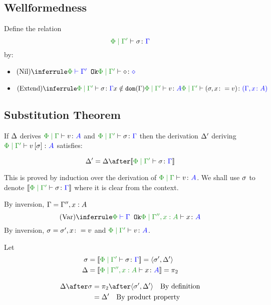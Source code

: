 \documentclass{report}
\begin{document}
    \subsection{Wellformedness}
Define the relation $$\etyperelation{\P}{\G'}{\si}{\G}$$ by:

\begin{itemize}
    \item $\ntreeruleI{Nil}{\wellformedok{\P}{\G'}}{\etyperelation{\P}{\G'}{\nil}{\nil}}$
    \item $\ntreeruleIII{Extend}{
        \etyperelation{\P}{\G'}{\si}{\G}
        }{
        x\notin\dom{\G}
        }{
        \etyperelation{\P}{\G'}{v}{A}
    }{
        \etyperelation{\P}{\G'}{(\si, x \setto v)}{(\gax)}
    }$
\end{itemize}
   
\subsection{Substitution Theorem}
If $\Delta$ derives $\gpetyperelation{v}{A}$ and $\etyperelation{\P}{\G'}{\si}{\G}$ then the derivation $\Delta'$ deriving $\etyperelation{\P}{\G'}{v\ssi}{A}$ satisfies:

\begin{equation}
    \D' = \D \after\deno{\etyperelation{\P}{\G'}{\si}{\G}}
\end{equation}

This is proved by induction over the derivation of $\etyperelation{\P}{\G}{v}{A}$.
We shall use $\sigma$ to denote $\deno{\etyperelation{\P}{\G'}{\si}{\G}}$ where it is clear from the context.

By inversion, $\Gamma = \Gamma'', x:A$
\begin{equation}
    \ntreeruleI{Var}{\wellformedok{\P}{\G}}{\etyperelation{\P}{\G'', x:A}{x}{A}}
\end{equation}
By inversion, $\sigma = \sigma', x\colon= v$ and $\etyperelation{\P}{\G'}{v}{A}$.

Let 
\begin{align*}
    \si &=\deno{\etyperelation{\P}{\G'}{\si}{\G}} = \pr{\si'}{\D'}\\
    \D &=\deno{\etyperelation{\P}{\G'', x:A}{x}{A}} = \pp\\
\end{align*}

\begin{align*}
    \D\after\si &= \pp\after\pr{\si'}{\D'}\qt{By definition}\\
    &= \D'\qt{By product property}
\end{align*}
\end{document}
